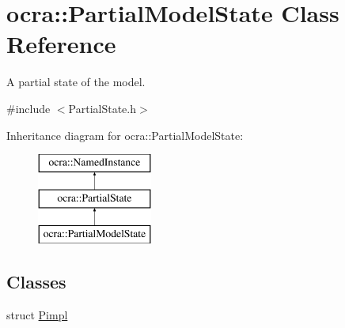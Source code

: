 \hypertarget{classocra_1_1PartialModelState}{}\section{ocra\+:\+:Partial\+Model\+State Class Reference}
\label{classocra_1_1PartialModelState}


A partial state of the model.  




{\ttfamily \#include $<$Partial\+State.\+h$>$}

Inheritance diagram for ocra\+:\+:Partial\+Model\+State\+:\begin{figure}[H]
\begin{center}
\leavevmode
\includegraphics[height=3.000000cm]{d1/dc1/classocra_1_1PartialModelState}
\end{center}
\end{figure}
\subsection*{Classes}
\begin{DoxyCompactItemize}
\item 
struct \hyperlink{structocra_1_1PartialModelState_1_1Pimpl}{Pimpl}
\end{DoxyCompactItemize}
